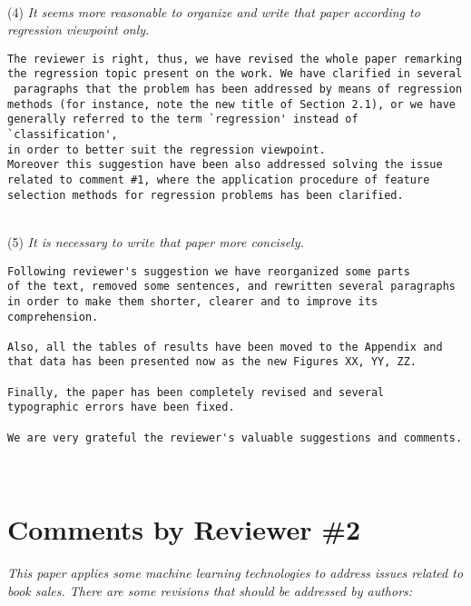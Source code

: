 \documentclass[preprint]{elsarticle}
\begin{document}
~\\
\noindent (4) \emph{It seems more reasonable to organize and write that paper according to regression viewpoint only. } 

\begin{verbatim}
The reviewer is right, thus, we have revised the whole paper remarking 
the regression topic present on the work. We have clarified in several
 paragraphs that the problem has been addressed by means of regression 
methods (for instance, note the new title of Section 2.1), or we have 
generally referred to the term `regression' instead of `classification', 
in order to better suit the regression viewpoint.
Moreover this suggestion have been also addressed solving the issue 
related to comment #1, where the application procedure of feature 
selection methods for regression problems has been clarified. 
\end{verbatim}

~\\
\noindent (5) \emph{It is necessary to write that paper more concisely. } 

\begin{verbatim}
Following reviewer's suggestion we have reorganized some parts 
of the text, removed some sentences, and rewritten several paragraphs 
in order to make them shorter, clearer and to improve its comprehension. 

Also, all the tables of results have been moved to the Appendix and 
that data has been presented now as the new Figures XX, YY, ZZ.

Finally, the paper has been completely revised and several 
typographic errors have been fixed. 

We are very grateful the reviewer's valuable suggestions and comments. 
\end{verbatim}


~\\

\section{Comments by Reviewer \#2}

\noindent \emph{This paper applies some machine learning technologies to address issues related to book sales. There are some revisions that should be addressed by authors: } \\
\end{document}
